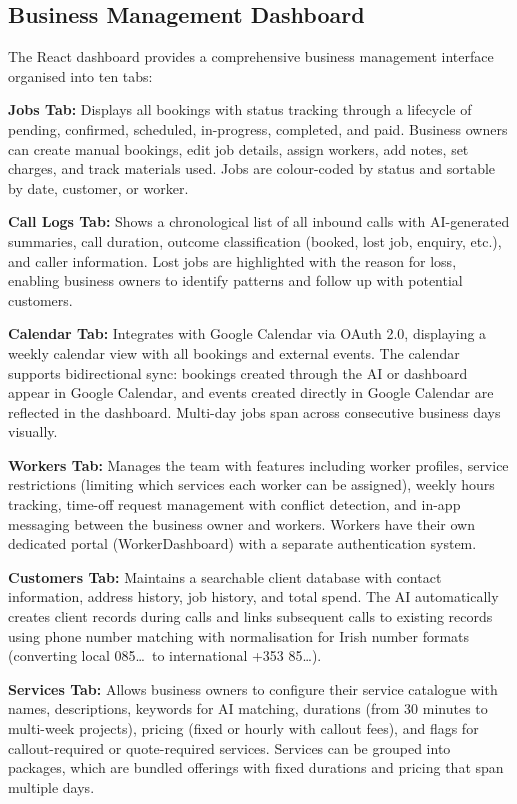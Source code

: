 \documentclass[conference]{IEEEtran}
\begin{document}
\subsection{Business Management Dashboard}

The React dashboard provides a comprehensive business management interface organised into ten tabs:

\textbf{Jobs Tab:} Displays all bookings with status tracking through a lifecycle of pending, confirmed, scheduled, in-progress, completed, and paid. Business owners can create manual bookings, edit job details, assign workers, add notes, set charges, and track materials used. Jobs are colour-coded by status and sortable by date, customer, or worker.

\textbf{Call Logs Tab:} Shows a chronological list of all inbound calls with AI-generated summaries, call duration, outcome classification (booked, lost job, enquiry, etc.), and caller information. Lost jobs are highlighted with the reason for loss, enabling business owners to identify patterns and follow up with potential customers.

\textbf{Calendar Tab:} Integrates with Google Calendar via OAuth 2.0, displaying a weekly calendar view with all bookings and external events. The calendar supports bidirectional sync: bookings created through the AI or dashboard appear in Google Calendar, and events created directly in Google Calendar are reflected in the dashboard. Multi-day jobs span across consecutive business days visually.

\textbf{Workers Tab:} Manages the team with features including worker profiles, service restrictions (limiting which services each worker can be assigned), weekly hours tracking, time-off request management with conflict detection, and in-app messaging between the business owner and workers. Workers have their own dedicated portal (WorkerDashboard) with a separate authentication system.

\textbf{Customers Tab:} Maintains a searchable client database with contact information, address history, job history, and total spend. The AI automatically creates client records during calls and links subsequent calls to existing records using phone number matching with normalisation for Irish number formats (converting local 085\ldots\ to international +353 85\ldots).

\textbf{Services Tab:} Allows business owners to configure their service catalogue with names, descriptions, keywords for AI matching, durations (from 30 minutes to multi-week projects), pricing (fixed or hourly with callout fees), and flags for callout-required or quote-required services. Services can be grouped into packages, which are bundled offerings with fixed durations and pricing that span multiple days.
\end{document}
